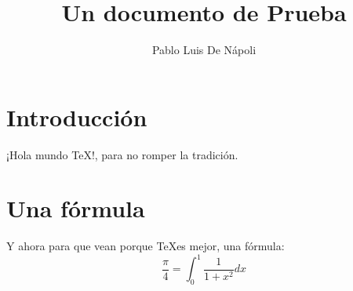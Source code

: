 \documentclass {article}
\begin{document}
 
	\title{Un documento de Prueba} 
	\author{Pablo Luis De Nápoli} 
	\maketitle 
	\section{Introducción} 
	¡Hola mundo \TeX !, para no romper la tradición. 
	\section{Una fórmula} 
	Y ahora para que vean porque \TeX es mejor, una fórmula: 
	$$ \frac{\pi}{4} = \int_0^1 \frac{1}{1+x^2} dx $$ 
\end{document}
